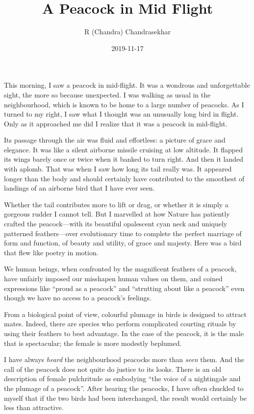 \documentclass[
  a4paper,
]{article}
\title{A Peacock in Mid Flight}
\author{R (Chandra) Chandrasekhar}
\date{2019-11-17}
\begin{document}
\maketitle




This morning, I saw a peacock in mid-flight. It was a wondrous and
unforgettable sight, the more so because unexpected. I was walking as
usual in the neighbourhood, which is known to be home to a large number
of peacocks. As I turned to my right, I saw what I thought was an
unusually long bird in flight. Only as it approached me did I realize
that it was a peacock in mid-flight.

Its passage through the air was fluid and effortless: a picture of grace
and elegance. It was like a silent airborne missile cruising at low
altitude. It flapped its wings barely once or twice when it banked to
turn right. And then it landed with aplomb. That was when I saw how long
its tail really was. It appeared longer than the body and should
certainly have contributed to the smoothest of landings of an airborne
bird that I have ever seen.

Whether the tail contributes more to lift or drag, or whether it is
simply a gorgeous rudder I cannot tell. But I marvelled at how Nature
has patiently crafted the peacock---with its beautiful opalescent cyan
neck and uniquely patterned feathers---over evolutionary time to
complete the perfect marriage of form and function, of beauty and
utility, of grace and majesty. Here was a bird that flew like poetry in
motion.

We human beings, when confronted by the magnificent feathers of a
peacock, have unfairly imposed our misshapen human values on them, and
coined expressions like ``proud as a peacock'' and ``strutting about
like a peacock'' even though we have no access to a peacock's feelings.

From a biological point of view, colourful plumage in birds is designed
to attract mates. Indeed, there are species who perform complicated
courting rituals by using their feathers to best advantage. In the case
of the peacock, it is the male that is spectacular; the female is more
modestly beplumed.

I have always \emph{heard} the neighbourhood peacocks more than
\emph{seen} them. And the call of the peacock does not quite do justice
to its looks. There is an old description of female pulchritude as
embodying ``the voice of a nightingale and the plumage of a peacock''.
After hearing the peacocks, I have often chuckled to myself that if the
two birds had been interchanged, the result would certainly be less than
attractive.
\end{document}
